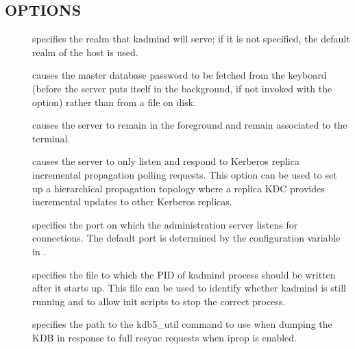 \documentclass[letterpaper,10pt,english]{sphinxmanual}
\begin{document}
\subsection{OPTIONS}
\label{\detokenize{admin/admin_commands/kadmind:options}}\begin{description}
\item[{ }] \leavevmode
\sphinxAtStartPar
specifies the realm that kadmind will serve; if it is not
specified, the default realm of the host is used.

\item[{}] \leavevmode
\sphinxAtStartPar
causes the master database password to be fetched from the
keyboard (before the server puts itself in the background, if not
invoked with the  option) rather than from a file on
disk.

\item[{}] \leavevmode
\sphinxAtStartPar
causes the server to remain in the foreground and remain
associated to the terminal.

\item[{}] \leavevmode
\sphinxAtStartPar
causes the server to only listen and respond to Kerberos replica
incremental propagation polling requests.  This option can be used
to set up a hierarchical propagation topology where a replica KDC
provides incremental updates to other Kerberos replicas.

\item[{ }] \leavevmode
\sphinxAtStartPar
specifies the port on which the administration server listens for
connections.  The default port is determined by the
 configuration variable in {\hyperref[\detokenize{admin/conf_files/kdc_conf:kdc-conf-5}]{}}.

\item[{ }] \leavevmode
\sphinxAtStartPar
specifies the file to which the PID of kadmind process should be
written after it starts up.  This file can be used to identify
whether kadmind is still running and to allow init scripts to stop
the correct process.

\item[{ }] \leavevmode
\sphinxAtStartPar
specifies the path to the kdb5\_util command to use when dumping the
KDB in response to full resync requests when iprop is enabled.


\end{description}
\end{document}
